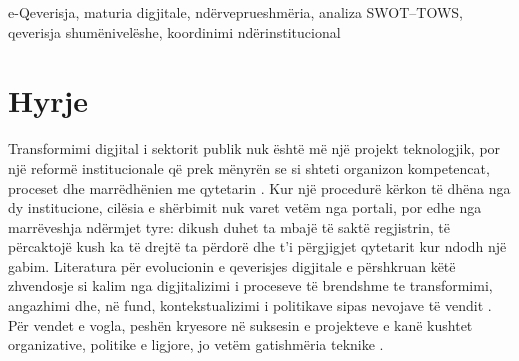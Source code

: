 \documentclass[conference]{IEEEtran}
\begin{document}
\maketitle
\begin{IEEEkeywords}
e-Qeverisja, maturia digjitale, ndërveprueshmëria, analiza SWOT--TOWS,
qeverisja shumënivelëshe, koordinimi ndërinstitucional
\end{IEEEkeywords}
\section{Hyrje}
\label{sec:hyrje}
Transformimi digjital i sektorit publik nuk është më një projekt
teknologjik, por një reformë institucionale që prek mënyrën se si shteti
organizon kompetencat, proceset dhe marrëdhënien me qytetarin
\cite{mergel2019}. Kur një procedurë kërkon të dhëna nga dy institucione,
cilësia e shërbimit nuk varet vetëm nga portali, por edhe nga marrëveshja
ndërmjet tyre: dikush duhet ta mbajë të saktë regjistrin, të përcaktojë kush
ka të drejtë ta përdorë dhe t'i përgjigjet qytetarit kur ndodh një gabim.
Literatura për evolucionin e qeverisjes digjitale e përshkruan këtë
zhvendosje si kalim nga digjitalizimi i proceseve të brendshme te
transformimi, angazhimi dhe, në fund, kontekstualizimi i politikave sipas
nevojave të vendit \cite{janowski2015}. Për vendet e vogla, peshën kryesore
në suksesin e projekteve e kanë kushtet organizative, politike e ligjore,
jo vetëm gatishmëria teknike \cite{glyptis2020}.
\end{document}
